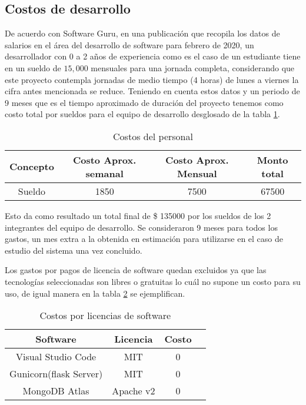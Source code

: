 \subsection{Costos de desarrollo}

De acuerdo con Software Guru\cite{pedro_galvan_estudio_2020}, en una publicación que recopila los datos de salarios en el área del desarrollo de software para febrero de 2020, un desarrollador con 0 a 2 años de experiencia como es el caso de un estudiante tiene en un sueldo de $15,000$ mensuales para una jornada completa, considerando que este proyecto contempla jornadas de medio tiempo (4 horas) de lunes a viernes la cifra antes mencionada se reduce. Teniendo en cuenta estos datos y un periodo de 9 meses que es el tiempo aproximado de duración del proyecto tenemos como costo total por sueldos para el equipo de desarrollo desglosado de la tabla \ref{tab:devs_salary}.

\begin{table}[h!]
    \centering
    \begin{tabular}{|c|c|c|c|}
    \hline
        Concepto & Costo Aprox. semanal & Costo Aprox. Mensual & Monto total \\ \hline
        Sueldo & 1850 & 7500 & 67500 \\ \hline
    \end{tabular}
    \caption{Costos del personal}
    \label{tab:devs_salary}
\end{table}


Esto da como resultado un total final de \$ 135000 por los sueldos de los 2 integrantes del equipo de desarrollo. Se consideraron 9 meses para todos los gastos, un mes extra a la obtenida en estimación para utilizarse en el caso de estudio del sistema una vez concluido.

Los gastos por pagos de licencia de software quedan excluidos ya que las tecnologías seleccionadas son libres o gratuitas lo cuál no supone un costo para su uso, de igual manera en la tabla \ref{tab:sw_licences} se ejemplifican.

\begin{table}
    \centering
    \begin{tabular}{|c|c|c|c|}
    \hline
        Software & Licencia & Costo \\ \hline
        Visual Studio Code  & MIT & 0  \\ \hline
        Gunicorn(flask Server) & MIT & 0 \\ \hline
        MongoDB Atlas & Apache v2 & 0 \\ \hline
    \end{tabular}
    \caption{Costos por licencias de software}
    \label{tab:sw_licences}
\end{table}

